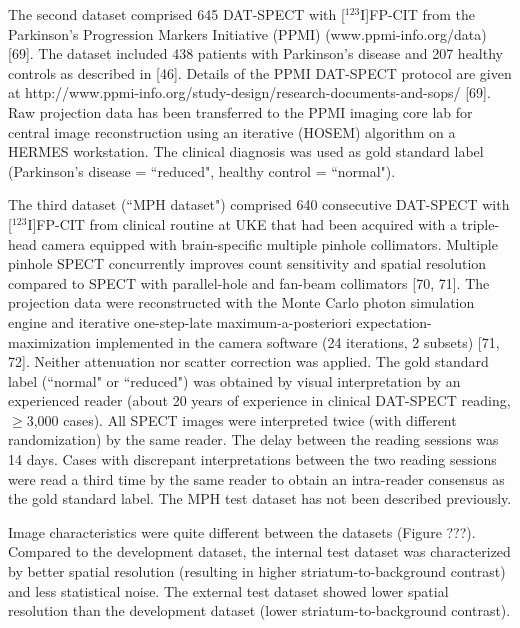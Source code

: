 The second dataset comprised 645 DAT-SPECT with [$^{123}$I]FP-CIT from the Parkinson's Progression Markers Initiative (PPMI) (www.ppmi-info.org/data) [69]. 
The dataset included 438 patients with Parkinson's disease and 207 healthy controls as described in [46]. 
Details of the PPMI DAT-SPECT protocol are given at http://www.ppmi-info.org/study-design/research-documents-and-sops/ [69]. 
Raw projection data has been transferred to the PPMI imaging core lab for central image reconstruction using an iterative (HOSEM) algorithm on a HERMES workstation. 
The clinical diagnosis was used as gold standard label (Parkinson's disease = ``reduced", healthy control = ``normal"). 

The third dataset (``MPH dataset") comprised 640 consecutive DAT-SPECT with [$^{123}$I]FP-CIT from clinical routine at UKE that had been acquired with a triple-head camera equipped with brain-specific multiple pinhole collimators. 
Multiple pinhole SPECT concurrently improves count sensitivity and spatial resolution compared to SPECT with parallel-hole and fan-beam collimators [70, 71]. 
The projection data were reconstructed with the Monte Carlo photon simulation engine and iterative one-step-late maximum-a-posteriori expectation-maximization implemented in the camera software (24 iterations, 2 subsets) [71, 72]. 
Neither attenuation nor scatter correction was applied. 
The gold standard label (``normal" or ``reduced") was obtained by visual interpretation by an experienced reader 
(about 20 years of experience in clinical DAT-SPECT reading, $\geq$3,000 cases).
All SPECT images were interpreted twice (with different randomization) by the same reader. 
The delay between the reading sessions was 14 days. 
Cases with discrepant interpretations between the two reading sessions were read a third time by the same reader to obtain an intra-reader consensus as the gold standard label. 
The MPH test dataset has not been described previously.

Image characteristics were quite different between the datasets (Figure ???). 
Compared to the development dataset, the internal test dataset was characterized by better spatial resolution 
(resulting in higher striatum-to-background contrast) and less statistical noise. 
The external test dataset showed lower spatial resolution than the development dataset (lower striatum-to-background contrast).


